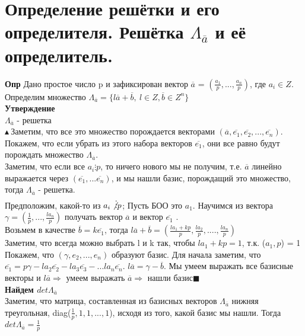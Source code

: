 \section{Определение решётки и его определителя. Решётка $\Lambda_{\overline{a}}$ и её определитель.}
\textbf{Опр} Дано простое число p и зафиксирован вектор $\overline{a}$ = $(\frac{a_1}{p}, ..., \frac{a_n}{p})$, где $a_i \in Z$. Определим множество $\Lambda_{\overline{a}} = \{l\overline{a} + \overline{b}, \ l \in Z, \overline{b} \in Z^n\}$
\\
\textbf{Утверждение }\\
$\Lambda_{\overline{a}}$ - решетка \\
$\blacktriangle \ $Заметим, что все это множество порождается векторами $(\overline{a}, \overline{e_1},\overline{e_2},...,\overline{e_n})$. Покажем, что если убрать из этого набора векторов $\overline{e_1}$, они все равно будут порождать множество $\Lambda_{\overline{a}}$. \\
Заметим, что если все $a_i \vdots p$, то ничего нового мы не получим, т.е. $\overline{a}$ линейно выражается через $(\overline{e_1},...\overline{e_n})$, и мы нашли базис, порождащий это множество, тогда $\Lambda_{\overline{a}}$ - решетка. 
\\
Предположим, какой-то из $a_i \not\vdots p$; Пусть БОО это $a_1$. Научимся из вектора $\gamma = (\frac{1}{p}, ..., \frac{la_n}{p})$ получать вектор $\overline{a} $ и вектор $\overline{e_1}$ . 
\\
Возьмем в качестве $\overline{b} = k\overline{e_1}$, тогда $l\overline{a} + \overline{b} = (\frac{la_1 + kp}{p}, \frac{la_2}{p}, ...., \frac{la_n}{p})$ \\
Заметим, что всегда можно выбрать l и k так, чтобы $la_1 + kp = 1$, т.к. ($a_1, p$) = 1\\
Покажем, что  $(\gamma,e_2,...,e_n)$ образуют базис. Для начала заметим, что $\overline{e_1} = p\gamma - la_2\overline{e_2} - la_3\overline{e_3} -...la_n\overline{e_n}$.  $l\overline{a} = \gamma - \overline{b}$. Мы умеем выражать все базисные векторы и $l\overline{a} \Longrightarrow$  умеем выражать $\overline{a} \Longrightarrow $ нашли базис$\blacksquare$
\\
\textbf{Найдем $det \Lambda_{\overline{a}}$ }\\ Заметим, что матрица, составленная из базисных векторов $\Lambda_{\overline{a}}$ нижняя треугольная, diag($\frac{1}{p}, 1,1,...,1$), исходя из того, какой базис мы нашли. Тогда  $det \Lambda_{\overline{a}} = \frac{1}{p}$